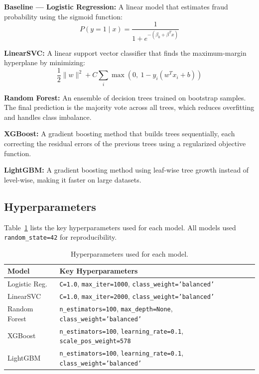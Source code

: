 \documentclass{article}
\begin{document}
\textbf{Baseline --- Logistic Regression:} A linear model that estimates
fraud probability using the sigmoid function:
\[
  P(y=1 \mid x) = \frac{1}{1 + e^{-(\beta_0 + \beta^T x)}}
\]

\textbf{LinearSVC:} A linear support vector classifier that finds the
maximum-margin hyperplane by minimizing:
\[
  \frac{1}{2}\|w\|^2 + C \sum_{i}
  \max\!\left(0,\ 1 - y_i(w^T x_i + b)\right)
\]

\textbf{Random Forest:} An ensemble of decision trees trained on
bootstrap samples. The final prediction is the majority vote across all
trees, which reduces overfitting and handles class imbalance.

\textbf{XGBoost:} A gradient boosting method that builds trees
sequentially, each correcting the residual errors of the previous trees
using a regularized objective function.

\textbf{LightGBM:} A gradient boosting method using leaf-wise tree
growth instead of level-wise, making it faster on large datasets.

\subsection{Hyperparameters}

Table~\ref{tab:hyperparams} lists the key hyperparameters used for each
model. All models used \texttt{random\_state=42} for reproducibility.

\begin{table}[!ht]
\centering
\caption{Hyperparameters used for each model.}
\label{tab:hyperparams}
\vskip 0.1in
\begin{small}
\begin{tabular}{p{1.6cm}p{5.2cm}}
\toprule
\textbf{Model} & \textbf{Key Hyperparameters} \\
\midrule
Logistic Reg. & \texttt{C=1.0}, \texttt{max\_iter=1000}, \texttt{class\_weight='balanced'} \\
\addlinespace
LinearSVC & \texttt{C=1.0}, \texttt{max\_iter=2000}, \texttt{class\_weight='balanced'} \\
\addlinespace
Random Forest & \texttt{n\_estimators=100}, \texttt{max\_depth=None}, \texttt{class\_weight='balanced'} \\
\addlinespace
XGBoost & \texttt{n\_estimators=100}, \texttt{learning\_rate=0.1}, \texttt{scale\_pos\_weight=578} \\
\addlinespace
LightGBM & \texttt{n\_estimators=100}, \texttt{learning\_rate=0.1}, \texttt{class\_weight='balanced'} \\
\bottomrule
\end{tabular}
\end{small}
\end{table}
\end{document}
